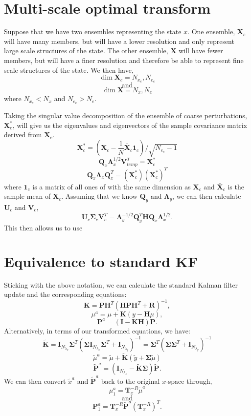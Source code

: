 \documentclass[11pt]{article} %
\newcommand{\mat}{\mathbf}
\begin{document}
\section{Multi-scale optimal transform}

Suppose that we have two ensembles representing the state $x$.
One ensemble, $\mat{X}_c$ will have many members, but will have a lower
resolution and only represent large scale structures of the state.
The other ensemble, $\mat{X}$ will have fewer members, but will
have a finer resolution and therefore be able to represent fine scale
structures of the state.
We then have,
\[
  \dim \mat{X}_c = N_{x_c}, N_{e_c}
\]
\[\text{and}\]
\[
  \dim \mat{X} = N_x, N_e
\]
where $N_{x_c} < N_x$ and $N_{e_c} > N_e$.

Taking the singular value decomposition of the ensemble of
coarse perturbations, $\mat{X}_c^*$, will give us the eigenvalues and
eigenvectors of the sample covariance matrix derived from $\mat{X}_c$.
\[
  \mat{X}_c^{*} = \left( \mat{X}_c - \frac{1}{N}\bar{\mat{X}}_c
  \mat{1}_c \right) / \sqrt{N_{e_c} - 1}
\]
\[
  \mat{Q}_x \mat{\Lambda}_x^{1/2} \mat{V}^T_{temp} = \mat{X}_c^*
\]
\[
  \mat{Q}_x \mat{\Lambda}_x \mat{Q}_x^T = (\mat{X}_c^*)
  {(\mat{X}_c^*)}^{T}
\]
where $\mat{1}_c$ is a matrix of all ones of with the same dimension as
$\mat{X}_c$ and $\bar{\mat{X}}_c$ is the sample mean of $\mat{X}_c$.
Assuming that we know $\mat{Q}_y$ and $\mat{\Lambda}_y$, we can then
calculate $\mat{U}_c$ and $\mat{V}_c$,
\[
  \mat{U}_c \mat{\Sigma}_c \mat{V}_c^T = \mat{\Lambda}^{-1/2}_y
  \mat{Q}_y^T \mat{H} \mat{Q}_x \mat{\Lambda}^{1/2}_x.
\]
This then allows us to use

\section{Equivalence to standard KF}

Sticking with the above notation, we can calculate the standard Kalman
filter update and the corresponding equations:
\[
  \mat{K} = \mat{P}\mat{H}^T (\mat{H} \mat{P} \mat{H}^T + \mat{R})^{-1},
\]
\[
  \mu^a = \mu + \mat{K} (y - \mat{H} \mu),
\]
\[
  \mat{P}^a = (\mat{I} - \mat{K} \mat{H}) \mat{P}.
\]
Alternatively, in terms of our transformed equations, we have:
\[
  \tilde{\mat{K}} = \mat{I}_{N_{\lambda_x}} \mat{\Sigma}^T ( \mat{\Sigma} \mat{I}_{N_{\lambda_x}}
  \mat{\Sigma}^T + \mat{I}_{N_{\lambda_y}})^{-1} = \mat{\Sigma}^T (\mat{\Sigma}
  \mat{\Sigma}^T + \mat{I}_{N_{\lambda_y}})^{-1}
\]
\[
  \tilde{\mu}^a = \tilde{\mu} + \tilde{\mat{K}}(\tilde{y} + \mat{\Sigma} \tilde{\mu})
\]
\[
  \tilde{\mat{P}}^a = (\mat{I}_{N_{\lambda_x}} - \tilde{\mat{K}} \mat{\Sigma}) \tilde{\mat{P}}.
\]
We can then convert $\tilde{x}^a$ and $\tilde{\mat{P}}^a$ back to the
original $x$-space through,
\[
  \mu^a_1 = \mat{T}_x^{-R} \tilde{\mu}^a
\]
\[
  \text{ and }
\]
\[
  \mat{P}^a_1 = \mat{T}_x^{-R} \tilde{\mat{P}}^a \left(\mat{T}_x^{-R}\right)^T.
\]
\end{document}
